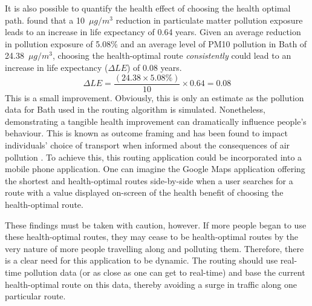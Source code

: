 \documentclass[11pt,twosided,a4paper]{report}
\begin{document}
It is also possible to quantify the health effect of choosing the health optimal path. \cite{Ebenstein2017lifeexpectancy} found that a 10~$\mu g/m^3$ reduction in particulate matter pollution exposure leads to an increase in life expectancy of 0.64 years. Given an average reduction in pollution exposure of 5.08\% and an average level of PM10 pollution in Bath of 24.38~$\mu g/m^3$, choosing the health-optimal route \textit{consistently} could lead to an increase in life expectancy ($\Delta LE$) of 0.08 years.
\begin{equation}
\Delta LE = \frac{(24.38 \times 5.08\%)}{10} \times 0.64 = 0.08
\end{equation}
This is a small improvement. Obviously, this is only an estimate as the pollution data for Bath used in the routing algorithm is simulated. Nonetheless, demonstrating a tangible health improvement can dramatically influence people's behaviour. This is known as outcome framing and has been found to impact individuals' choice of transport when informed about the consequences of air pollution \citep{mir2016framing}. To achieve this, this routing application could be incorporated into a mobile phone application. One can imagine the Google Maps application offering the shortest and health-optimal routes side-by-side when a user searches for a route with a value displayed on-screen of the health benefit of choosing the health-optimal route.

These findings must be taken with caution, however. If more people began to use these health-optimal routes, they may cease to be health-optimal routes by the very nature of more people travelling along and polluting them. Therefore, there is a clear need for this application to be dynamic. The routing should use real-time pollution data (or as close as one can get to real-time) and base the current health-optimal route on this data, thereby avoiding a surge in traffic along one particular route.




\end{document}
